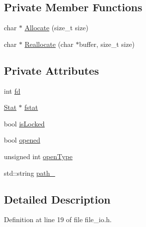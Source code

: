 \subsection*{Private Member Functions}
\begin{DoxyCompactItemize}
\item 
char $\ast$ \hyperlink{classmocha_1_1_file_ac0e5cc0f09384b1298243ac5f9dd68a4}{Allocate} (size\_\-t size)
\item 
char $\ast$ \hyperlink{classmocha_1_1_file_a64bbdac45b1e87ef4087d1b55e717fc0}{Reallocate} (char $\ast$buffer, size\_\-t size)
\end{DoxyCompactItemize}
\subsection*{Private Attributes}
\begin{DoxyCompactItemize}
\item 
int \hyperlink{classmocha_1_1_file_ac34e63054b7ff96513b163692909bc06}{fd}
\item 
\hyperlink{classmocha_1_1_stat}{Stat} $\ast$ \hyperlink{classmocha_1_1_file_a1af3675df21335d14aefa9d775c808e2}{fstat}
\item 
bool \hyperlink{classmocha_1_1_file_a9c49e57fb0a425d80226ea3962f7f1ad}{isLocked}
\item 
bool \hyperlink{classmocha_1_1_file_a3a79db70f833a45ee94ea3f35ce270b8}{opened}
\item 
unsigned int \hyperlink{classmocha_1_1_file_aedc322e34cdfe5248644cf425b165ae7}{openType}
\item 
std::string \hyperlink{classmocha_1_1_file_ab9331e1a837f5d7b73925b9c836bc754}{path\_\-}
\end{DoxyCompactItemize}


\subsection{Detailed Description}


Definition at line 19 of file file\_\-io.h.



